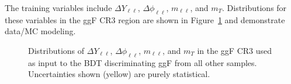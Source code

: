The training variables include $\Delta Y_{\ell\ell}$, $\Delta \phi_{\ell\ell}$, $m_{\ell\ell}$, and $m_T$. Distributions for these variables in the ggF CR3 region are shown in Figure~\ref{fig:ggFCR3} and demonstrate data/MC modeling.
\begin{figure}[!h]
  \hfill
  \hfill
  \hfill
  \hfill
{\caption{Distributions of $\Delta Y_{\ell\ell}$, $\Delta \phi_{\ell\ell}$, $m_{\ell\ell}$, and $m_T$ in the ggF CR3 used as input to the BDT discriminating ggF from all other samples. Uncertainties shown (yellow) are purely statistical.
\label{fig:ggFCR3}}}
\end{figure} 

